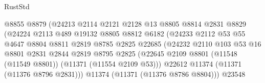 \begin{lexlean}{RustStd}
\begin{coremodule}
                                      @8855
                                      @8879
                                      (@24213
                                        @2114
                                        @2121
                                        @2128
                                        @13
                                        @8805
                                        @8814
                                        @2831
                                        @8829
                                        (@24224
                                          @2113
                                          @489
                                          @19132
                                          @8805
                                          @8812
                                          @6182
                                          (@24233
                                            @2112
                                            @53
                                            @55
                                            @4647
                                            @8804
                                            @8811
                                            @2819
                                            @8785
                                            @2825
                                            @22685
                                            (@24232
                                              @2110
                                              @103
                                              @53
                                              @16
                                              @8801
                                              @2831
                                              @2844
                                              @2819
                                              @8795
                                              @2825
                                              (@22645
                                                @2109
                                                @8801
                                                (@11548 (@11549 @8801))
                                                (@11371 (@11554 @2109 @53)))
                                              @22612
                                              @11374
                                              (@11371 (@11376 @8796 @2831)))
                                            @11374
                                            (@11371 (@11376 @8786 @8804)))
                                          @23548

\end{coremodule}
\end{lexlean}

